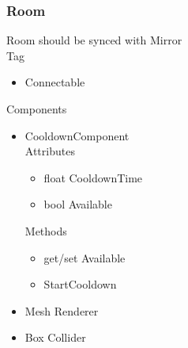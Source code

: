\documentclass[11pt]{article}
\begin{document}
\subsubsection{Room}
Room should be synced with Mirror
\\Tag
\begin{itemize}
\item Connectable
\end{itemize}
Components
\begin{itemize}
\item CooldownComponent
\\Attributes
\begin{itemize}
\item float CooldownTime
\item bool Available
\end{itemize}
Methods
\begin{itemize}
\item get/set Available
\item StartCooldown
\end{itemize}
\item Mesh Renderer
\item Box Collider
\end{itemize}
\end{document}
